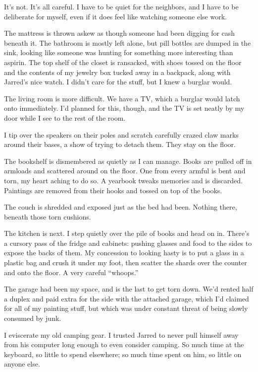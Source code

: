 It's not. It's all careful. I have to be quiet for the neighbors, and I have to be deliberate for myself, even if it does feel like watching someone else work.

The mattress is thrown askew as though someone had been digging for cash beneath it. The bathroom is mostly left alone, but pill bottles are dumped in the sink, looking like someone was hunting for something more interesting than aspirin. The top shelf of the closet is ransacked, with shoes tossed on the floor and the contents of my jewelry box tucked away in a backpack, along with Jarred's nice watch. I didn't care for the stuff, but I knew a burglar would.

The living room is more difficult. We have a TV, which a burglar would latch onto immediately. I'd planned for this, though, and the TV is set neatly by my door while I see to the rest of the room.

I tip over the speakers on their poles and scratch carefully crazed claw marks around their bases, a show of trying to detach them. They stay on the floor.

The bookshelf is dismembered as quietly as I can manage. Books are pulled off in armloads and scattered around on the floor. One from every armful is bent and torn, my heart aching to do so. A yearbook tweaks memories and is discarded. Paintings are removed from their hooks and tossed on top of the books.

The couch is shredded and exposed just as the bed had been. Nothing there, beneath those torn cushions.

The kitchen is next. I step quietly over the pile of books and head on in. There's a cursory pass of the fridge and cabinets: pushing glasses and food to the sides to expose the backs of them. My concession to looking hasty is to put a glass in a plastic bag and crush it under my foot, then scatter the shards over the counter and onto the floor. A very careful ``whoops.''

The garage had been my space, and is the last to get torn down. We'd rented half a duplex and paid extra for the side with the attached garage, which I'd claimed for all of my painting stuff, but which was under constant threat of being slowly consumed by junk.

I eviscerate my old camping gear. I trusted Jarred to never pull himself away from his computer long enough to even consider camping. So much time at the keyboard, so little to spend elsewhere; so much time spent on him, so little on anyone else.

